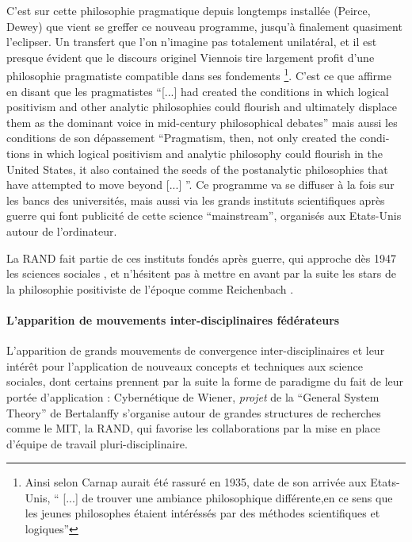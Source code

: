 C'est sur cette philosophie pragmatique depuis longtemps installée (Peirce, Dewey) que vient se greffer ce nouveau programme, jusqu'à finalement quasiment l'eclipser. Un transfert que l'on n'imagine pas totalement unilatéral, et il est presque évident que le discours originel Viennois tire largement profit d'une philosophie pragmatiste compatible dans ses fondements \footnote{ Ainsi selon \textcite[149]{Ouelbani2006} Carnap aurait été rassuré en 1935, date de son arrivée aux Etats-Unis, \enquote{ [...] de trouver une ambiance philosophique différente,en ce sens que les jeunes philosophes étaient intéréssés par des méthodes scientifiques et logiques}}. C'est ce que \textcite[123]{Wilson1995} affirme en disant que les pragmatistes \foreignquote{english}{[...] had created the conditions in which logical positivism and other analytic philosophies could flourish and ultimately displace them as the dominant voice in mid-century philosophical debates} mais aussi les conditions de son dépassement \foreignquote{english}{Pragmatism, then, not only created the conditions in which logical positivism and analytic philosophy could flourish in the United States, it also contained the seeds of the postanalytic philosophies that have attempted to move beyond [...] }. Ce programme va se diffuser à la fois sur les bancs des universités, mais aussi via les grands instituts scientifiques après guerre qui font publicité de cette science \foreignquote{english}{mainstream}, organisés aux Etats-Unis autour de l'ordinateur. 

La RAND fait partie de ces instituts fondés après guerre, qui approche dès 1947 les sciences sociales \autocite{Rand106}, et n'hésitent pas à mettre en avant par la suite les stars de la philosophie positiviste de l'époque comme Reichenbach \autocite[384-385]{Barnes2011} .

\paragraph{L'apparition de mouvements inter-disciplinaires fédérateurs}

L'apparition de grands mouvements de convergence inter-disciplinaires et leur intérêt pour l'application de nouveaux concepts et techniques aux science sociales, dont certains prennent par la suite la forme de paradigme du fait de leur portée d'application : Cybernétique de Wiener, \textit{projet} de la \foreignquote{english}{General System Theory} de Bertalanffy \autocite[9]{Pouvreau2013} s'organise autour de grandes structures de recherches comme le MIT, la RAND, qui favorise les collaborations par la mise en place d'équipe de travail pluri-disciplinaire.

